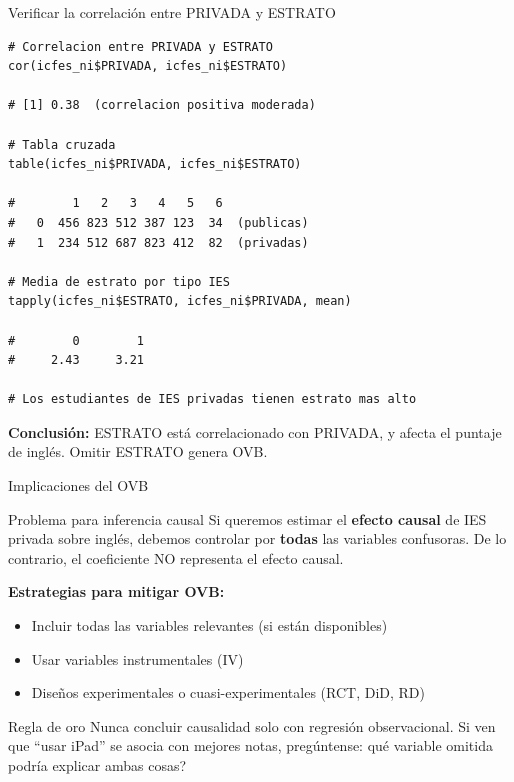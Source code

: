 \documentclass[aspectratio=169, 11pt]{beamer}
\begin{document}
\begin{frame}[fragile]{Verificar la correlaci\'on entre PRIVADA y ESTRATO}
\begin{lstlisting}[basicstyle=\ttfamily\scriptsize]
# Correlacion entre PRIVADA y ESTRATO
cor(icfes_ni$PRIVADA, icfes_ni$ESTRATO)

# [1] 0.38  (correlacion positiva moderada)

# Tabla cruzada
table(icfes_ni$PRIVADA, icfes_ni$ESTRATO)

#        1   2   3   4   5   6
#   0  456 823 512 387 123  34  (publicas)
#   1  234 512 687 823 412  82  (privadas)

# Media de estrato por tipo IES
tapply(icfes_ni$ESTRATO, icfes_ni$PRIVADA, mean)

#        0        1
#     2.43     3.21

# Los estudiantes de IES privadas tienen estrato mas alto
\end{lstlisting}
\vspace{-2pt}
{\footnotesize \textbf{Conclusi\'on:} ESTRATO est\'a correlacionado con PRIVADA, y afecta el puntaje de ingl\'es. Omitir ESTRATO genera OVB.}
\end{frame}

\begin{frame}{Implicaciones del OVB}
\begin{alertblock}{Problema para inferencia causal}
\small Si queremos estimar el \textbf{efecto causal} de IES privada sobre ingl\'es, debemos controlar por \textbf{todas} las variables confusoras. De lo contrario, el coeficiente NO representa el efecto causal.
\end{alertblock}

\vspace{0.1cm}
\textbf{Estrategias para mitigar OVB:}
\begin{itemize}
  \item Incluir todas las variables relevantes (si est\'an disponibles)
  \item Usar variables instrumentales (IV)
  \item Dise\~nos experimentales o cuasi-experimentales (RCT, DiD, RD)
\end{itemize}

\vspace{0.1cm}
\begin{exampleblock}{Regla de oro}
\small Nunca concluir causalidad solo con regresi\'on observacional. Si ven que ``usar iPad'' se asocia con mejores notas, preg\'untense: \textquestiondown qu\'e variable omitida podr\'ia explicar ambas cosas?
\end{exampleblock}
\end{frame}
\end{document}
